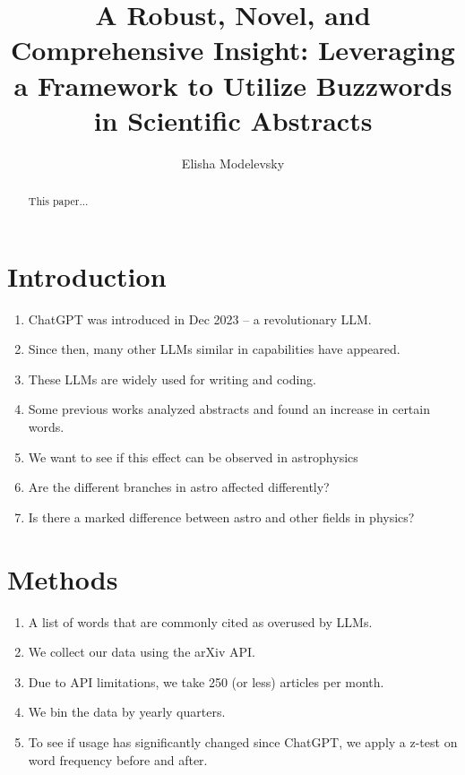 \documentclass[twocolumn]{aastex701}
\begin{document}
\title{A Robust, Novel, and Comprehensive Insight: Leveraging a Framework to Utilize Buzzwords in Scientific Abstracts}

\author[orcid=0000-0003-4105-3443]{Elisha Modelevsky}

\begin{abstract}

This paper...

\end{abstract}


\section{Introduction} 

\begin{enumerate}
    \item ChatGPT was introduced in Dec 2023 -- a revolutionary LLM.
    \item Since then, many other LLMs similar in capabilities have appeared.
    \item These LLMs are widely used for writing and coding.
    \item Some previous works analyzed abstracts and found an increase in certain words.
    \item We want to see if this effect can be observed in astrophysics
    \item Are the different branches in astro affected differently?
    \item Is there a marked difference between astro and other fields in physics?
\end{enumerate}


\section{Methods}

\begin{enumerate}
    \item A list of words that are commonly cited as overused by LLMs.
    \item We collect our data using the arXiv API.
    \item Due to API limitations, we take 250 (or less) articles per month.
    \item We bin the data by yearly quarters.
    \item To see if usage has significantly changed since ChatGPT, we apply a z-test on word frequency before and after.
\end{enumerate}
\end{document}
